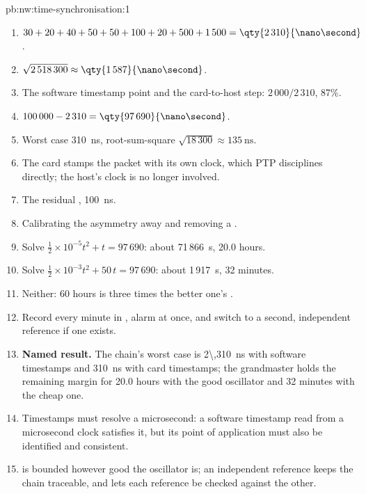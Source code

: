 \begin{solution}{pb:nw:time-synchronisation:1}
\begin{enumerate}
\item $30 + 20 + 40 + 50 + 50 + 100 + 20 + 500 + 1\,500 = \qty{2\,310}{\nano\second}$.
\item $\sqrt{2\,518\,300} \approx \qty{1\,587}{\nano\second}$.
\item The software timestamp point and the card-to-host step: $2\,000/2\,310$, 87\%.
\item $100\,000 - 2\,310 = \qty{97\,690}{\nano\second}$.
\item Worst case \qty{310}{\nano\second}, root-sum-square $\sqrt{18\,300} \approx \qty{135}{\nano\second}$.
\item The card stamps the packet with its own clock, which PTP disciplines directly; the host's clock is no longer involved.
\item The residual , \qty{100}{\nano\second}.
\item Calibrating the asymmetry away and removing a .
\item Solve $\tfrac12 \times 10^{-5} t^2 + t = 97\,690$: about 71\,866~s, 20.0 hours.
\item Solve $\tfrac12 \times 10^{-3} t^2 + 50\,t = 97\,690$: about 1\,917~s, 32 minutes.
\item Neither: 60 hours is three times the better one's .
\item Record every minute in , alarm at once, and switch to a second, independent reference if one exists.
\item \textbf{Named result.} The chain's worst case is \qty{2\,310}{\nano\second} with software timestamps and \qty{310}{\nano\second} with
  card timestamps; the grandmaster holds the remaining margin for 20.0 hours with the good oscillator and 32 minutes with the cheap one.
\item Timestamps must resolve a microsecond: a software timestamp read from a microsecond clock satisfies it, but its point of
  application must also be identified and consistent.
\item {} is bounded however good the oscillator is; an independent reference keeps the chain traceable, and lets each reference be
  checked against the other.

\end{enumerate}
\end{solution}
